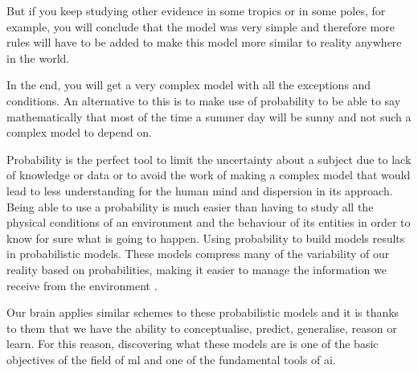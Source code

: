 But if you keep studying other evidence in some tropics or in some poles, for example, you will conclude that the model was very simple and therefore more rules will have to be added to make this model more similar to reality anywhere in the world.
\newline

In the end, you will get a very complex model with all the exceptions and conditions. An alternative to this is to make use of probability to be able to say mathematically that most of the time a summer day will be sunny and not such a complex model to depend on.
\newline

Probability is the perfect tool to limit the uncertainty about a subject due to lack of knowledge or data or to avoid the work of making a complex model that would lead to less understanding for the human mind and dispersion in its approach. Being able to use a probability is much easier than having to study all the physical conditions of an environment and the behaviour of its entities in order to know for sure what is going to happen. Using probability to build models results in probabilistic models. These models compress many of the variability of our reality based on probabilities, making it easier to manage the information we receive from the environment \cite{kuhne}.
\newline

Our brain applies similar schemes to these probabilistic models and it is thanks to them that we have the ability to conceptualise, predict, generalise, reason or learn. For this reason, discovering what these models are is one of the basic objectives of the field of \acrlong{ml} and one of the fundamental tools of \acrshort{ai}.
\newline